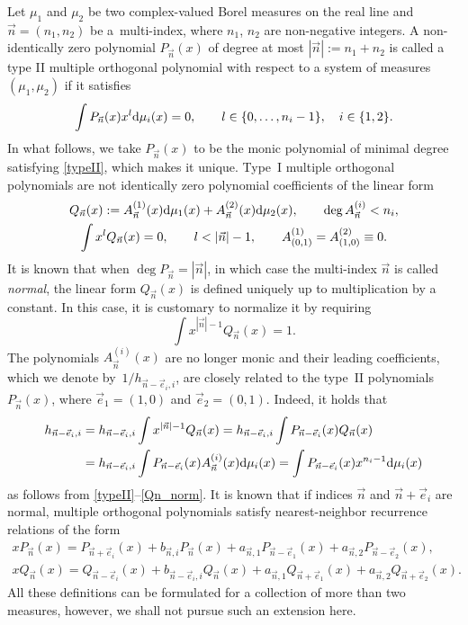 \documentclass[pdftex]{sigma}
\numberwithin{equation}{section}
\newcommand{\n}{{\vec n}}
\begin{document}
Let $ \mu_1 $ and $ \mu_2 $ be two complex-valued Borel measures on the real line and $ \n=(n_1,n_2) $ be a~multi-index, where $ n_1$, $n_2 $ are non-negative integers. A non-identically zero polynomial $ P_{\n}(x) $ of degree at most $ |\n| := n_1+n_2 $ is called a type II multiple orthogonal polynomial with respect to a system of measures $ (\mu_1,\mu_2) $ if it satisfies
\begin{equation}\label{typeII}
\int P_\n(x)x^l{\rm d}\mu_i(x) =0, \qquad l\in\{0,\dots,n_i-1\}, \quad i\in\{1,2\}.
\end{equation}
In what follows, we take $ P_\n(x) $ to be the monic polynomial of minimal degree satisfying \eqref{typeII}, which makes it unique. Type~I multiple orthogonal polynomials are not identically zero polynomial coefficients of the linear form
\begin{gather}
Q_\n(x):= A_\n^{(1)}(x){\rm d}\mu_1(x) + A_\n^{(2)}(x){\rm d}\mu_2(x), \qquad \deg A_\n^{(i)} < n_i, \nonumber \\
\int x^lQ_\n(x) = 0, \qquad l<|\n|-1, \qquad A_{(0,1)}^{(1)} = A_{(1,0)}^{(2)} \equiv 0.\label{typeI}
\end{gather}
It is known \cite[Section~23.1]{Ismail} that when $\deg P_\n=|\n|$, in which case the multi-index $ \n $ is called \emph{normal}, the linear form $ Q_\n(x) $ is defined uniquely up to multiplication by a constant. In this case, it is customary to normalize it by requiring
\begin{equation}
\label{Qn_norm}
\int x^{|\n|-1}Q_{\n}(x)=1 .
\end{equation}
The polynomials $ A_\n^{(i)}(x) $ are no longer monic and their leading coefficients, which we denote by~$ 1/h_{\n-\vec e_i,i} $, are closely related to the type~II polynomials $ P_\n(x) $, where $ \vec e_1=(1,0) $ and $ \vec e_2 = (0,1) $. Indeed, it holds that
\begin{align}
\label{connection}
h_{\n-\vec e_i,i} &= h_{\n-\vec e_i,i} \int x^{|\n|-1}Q_\n(x) = h_{\n-\vec e_i,i}\int P_{\n-\vec e_i}(x)Q_\n(x) \nonumber \\
& = h_{\n-\vec e_i,i}\int P_{\n-\vec e_i}(x) A_\n^{(i)}(x){\rm d}\mu_i(x) = \int P_{\n-\vec e_i}(x) x^{n_i-1}{\rm d}\mu_i(x)
\end{align}
as follows from \eqref{typeII}--\eqref{Qn_norm}. It is known \cite[Theorem~23.1.11]{Ismail} that if indices $ \n $ and $ \n+\vec e_i $ are normal, multiple orthogonal polynomials satisfy nearest-neighbor recurrence relations of the form
\begin{gather}
xP_\n(x) = P_{\n+\vec e_i}(x) + b_{\n,i}P_\n(x) + a_{\n,1}P_{\n-\vec e_1}(x) + a_{\n,2}P_{\n-\vec e_2}(x), \nonumber \\
xQ_\n(x) = Q_{\n-\vec e_i}(x) + b_{\n-\vec e_i,i}Q_\n(x) + a_{\n,1}Q_{\n+\vec e_1}(x) + a_{\n,2}Q_{\n+\vec e_2}(x).\label{rec_rel}
\end{gather}
All these definitions can be formulated for a collection of more than two measures, however, we shall not pursue such an extension here.
\end{document}
